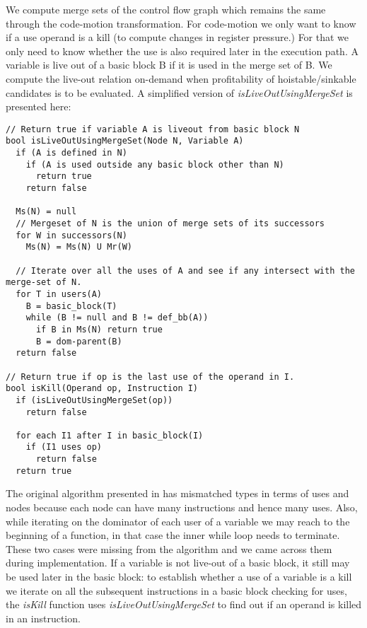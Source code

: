 \documentclass[acmlarge,review,anonymous]{acmart}\settopmatter{printfolios=true}
\begin{document}
We compute merge sets of the control flow graph which remains the same through
the code-motion transformation. For code-motion we only want to know if a use
operand is a kill (to compute changes in register pressure.) For that we only
need to know whether the use is also required later in the execution path. A
variable is live out of a basic block B if it is used in the merge set of B. We
compute the live-out relation on-demand when profitability of hoistable/sinkable
candidates is to be evaluated. A simplified version of
\emph{isLiveOutUsingMergeSet} is presented here:

\begin{verbatim}
// Return true if variable A is liveout from basic block N
bool isLiveOutUsingMergeSet(Node N, Variable A)
  if (A is defined in N)
    if (A is used outside any basic block other than N)
      return true
    return false

  Ms(N) = null
  // Mergeset of N is the union of merge sets of its successors
  for W in successors(N)
    Ms(N) = Ms(N) U Mr(W)

  // Iterate over all the uses of A and see if any intersect with the merge-set of N.
  for T in users(A)
    B = basic_block(T)
    while (B != null and B != def_bb(A))
      if B in Ms(N) return true
      B = dom-parent(B)
  return false

// Return true if op is the last use of the operand in I.
bool isKill(Operand op, Instruction I)
  if (isLiveOutUsingMergeSet(op))
    return false

  for each I1 after I in basic_block(I)
    if (I1 uses op)
      return false
  return true
\end{verbatim}

The original algorithm presented in \cite{das2012} has mismatched types in terms
of uses and nodes because each node can have many instructions and hence many
uses. Also, while iterating on the dominator of each user of a variable we may
reach to the beginning of a function, in that case the inner while loop needs to
terminate. These two cases were missing from the algorithm and we came across
them during implementation. If a variable is not live-out of a basic block, it
still may be used later in the basic block: to establish whether a use of a
variable is a kill we iterate on all the subsequent instructions in a basic
block checking for uses, the \emph{isKill} function uses
\emph{isLiveOutUsingMergeSet} to find out if an operand is killed in an
instruction.
\end{document}
